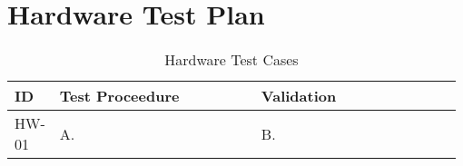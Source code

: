

\setcounter{section}{2}
\section{Hardware Test Plan}
\bigskip




\bigskip
\bgroup
\def\arraystretch{1.25}
\begin{table}[h!]
    \centering
    \begin{tabular}{|m{0.075\linewidth}|m{0.45\linewidth}|m{0.45\linewidth}|} 
    \hline
    ID & Test Proceedure & Validation\\ 

    \hline
    HW-01
    & A.  
    & B. \\ 
    \hline    





    \hline
    \end{tabular}
    \caption{Hardware Test Cases}
\end{table}
